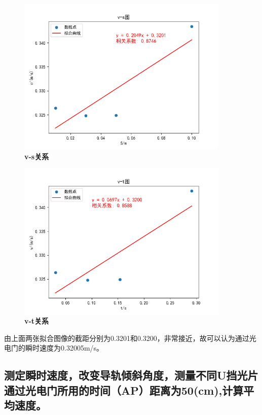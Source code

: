 \documentclass[UTF8]{article}
\theoremstyle{MyLineTheoremStyle} %
\theoremstyle{MyBlockTheoremStyle} %
\theoremstyle{MySubsubsectionStyle} %
\begin{document}
\begin{figure}[H]
    \centering
    \includegraphics[width=0.9\textwidth]{Figure_5.png}
    \caption{\bfseries v-s关系}
\end{figure}

\begin{figure}[H]
    \centering
    \includegraphics[width=0.9\textwidth]{Figure_6.png}
    \caption{\bfseries v-t关系}
\end{figure}

\indent 由上面两张拟合图像的截距分别为0.3201和0.3200，非常接近，故可以认为通过光电门的瞬时速度为0.32005m/s。\\


\subsection{测定瞬时速度，改变导轨倾斜角度，测量不同U挡光片通过光电门所用的时间（AP）距离为50(cm),计算平均速度。}
\end{document}
